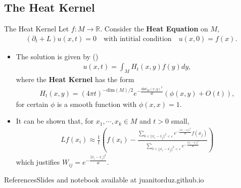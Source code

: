\documentclass[11pt]{beamer}
\begin{document}
\subsection{The Heat Kernel}

\begin{frame}{The Heat Kernel}
Let $f:M\longrightarrow \mathbb{R}$. Consider the \textbf{Heat Equation} on $M$, 
\begin{align*}
\left({\partial_t} + L\right)u(x,t)  = 0
\quad \text{with intitial condition}
\quad
u(x,0) = f(x).
\end{align*}
\pause
\begin{itemize}
\item The solution is given by (\cite{R1997})
\begin{align*}
u(x,t) = \int_{M} H_t(x,y)f(y) dy, 
\end{align*}
where the \textbf{Heat Kernel} has the form
\begin{align*}
H_t(x,y) = (4\pi t)^{-\text{dim}(M)/2} e^{-\frac{\text{dist}_M(x,y)^2}{4t}} (\phi(x,y) + O(t)),
\end{align*}
for certain $\phi$ is a smooth function with $\phi(x,x) = 1$. 
\pause
\item It can be shown that, for $x_1, \cdots, x_k \in M$ and $t>0$ small,
\begin{align*}
Lf(x_i) \approx \frac{1}{t}\left(f(x_i) - 
\frac{
\sum_{0 < ||x_i - x_j||^2 <\varepsilon}
e^{-\frac{||x_i - x_j||^2}{4t}}f(x_j) 
}
{
\sum_{0 < ||x_i - x_j||^2 <\varepsilon}
e^{-\frac{||x_i - x_j||^2}{4t}}
}
\right)
\end{align*}
which justifies $W_{ij}=e^{-\frac{||x_i - x_j||^2}{4t}}$. 
\end{itemize}
\end{frame}

\begin{frame}{References}{Slides and notebook available at juanitorduz.github.io}

 
\end{frame}
\end{document}
